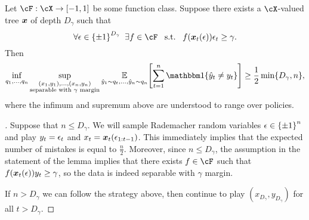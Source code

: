 \begin{lemma}
\label{lem:fat_shattering}
Let $\cF:\cX\to\brk{-1,1}$ be some function class. Suppose there exists a $\cX$-valued tree $\boldsymbol{x}$ of depth $D_{\gamma}$ such that
\begin{equation}
\label{eq:tree_shattered}
\forall{}\eps\in\pmo^{D_{\gamma}}\;\;\exists{}f\in\cF\;\;\;\textrm{s.t.}\;\;\; f(\mb{x}_t(\eps))\eps_{t}\geq{}\gamma.
\end{equation}
Then
\[
    \inf_{q_1,\ldots,q_n}\sup_{\substack{(x_1, y_1),\ldots, (x_n,y_n)\\\textnormal{separable with $\gamma$ margin}}}\En_{\yh_1\sim{}q_t,\ldots,\yh_n\sim{}q_n}\brk*{
    \sum_{t=1}^{n}\ind\crl*{\yh_t\neq{}y_t}
    } \geq{} \frac{1}{2}\min\crl*{D_{\gamma}, n},
\]
where the infimum and supremum above are understood to range over policies.

\end{lemma}
\begin{proof}[]
Suppose that $n\leq{}D_{\gamma}$. We will sample Rademacher random variables $\epsilon\in\left\{\pm{}1\right\}^{n}$ and play $y_t=\epsilon_t$ and $x_t=\boldsymbol{x}_t(\epsilon_{1:t-1})$. This immediately implies that the expected number of mistakes is equal to $\frac{n}{2}$. Moreover, since $n\leq{}D_{\gamma}$, the assumption in the statement of the lemma implies that  there exists $f\in\cF$ such that $f(\boldsymbol{x}_t(\epsilon))y_t\geq{}\gamma$, so the data is indeed separable with $\gamma$ margin.

If $n>D_{\gamma}$ we can follow the strategy above, then continue to play $(x_{D_{\gamma}}, y_{D_{\gamma}})$ for all $t>D_{\gamma}$.
\end{proof}

